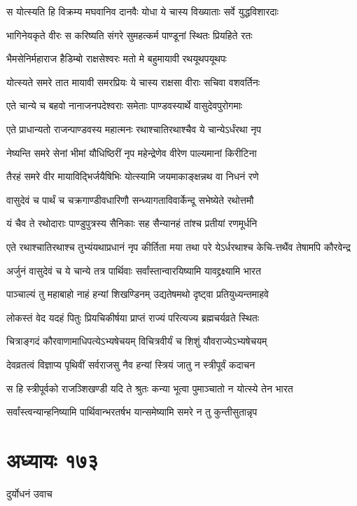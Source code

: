 \twolineshloka
{स योत्स्यति हि विक्रम्य मघवानिव दानवैः}
{योधा ये चास्य विख्याताः सर्वे युद्धविशारदाः}


\twolineshloka
{भागिनेयकृते वीरः स करिष्यति संगरे}
{सुमहत्कर्म पाण्डूनां स्थितः प्रियहिते रतः}


\twolineshloka
{भैमसेनिर्महाराज हैडिम्बो राक्षसेश्वरः}
{मतो मे बहुमायावी रथयूथपयूथपः}


\twolineshloka
{योत्स्यते समरे तात मायावी समरप्रियः}
{ये चास्य राक्षसा वीराः सचिवा वशवर्तिनः}


\twolineshloka
{एते चान्ये च बहवो नानाजनपदेश्वराः}
{समेताः पाण्डवस्यार्थे वासुदेवपुरोगमाः}


\twolineshloka
{एते प्राधान्यतो राजन्पाण्डवस्य महात्मनः}
{रथाश्चातिरथाश्चैव ये चान्येऽर्धंरथा नृप}


\twolineshloka
{नेष्यन्ति समरे सेनां भीमां यौधिष्ठिरीं नृप}
{महेन्द्रेणेव वीरेण पाल्यमानां किरीटिना}


\twolineshloka
{तैरहं समरे वीर मायाविद्भिर्जयैषिभिः}
{योत्स्यामि जयमाकाङ्क्षन्नथ वा निधनं रणे}


\twolineshloka
{वासुदेवं च पार्थं च चक्रगाण्डीवधारिणौ}
{सन्ध्यागताविवार्केन्दू सभेष्येते रथोत्तमौ}


\twolineshloka
{यं चैव ते रथोदाराः पाण्डुपुत्रस्य सैनिकाः}
{सह सैन्यानहं तांश्च प्रतीयां रणमूर्धनि}


\twolineshloka
{एते रथाश्चातिरथाश्च तुभ्यंयथाप्रधानं नृप कीर्तिता मया}
{तथा परे येऽर्धरथाश्च केचि-त्तथैंव तेषामपि कौरवेन्द्र}


\twolineshloka
{अर्जुनं वासुदेवं च ये चान्ये तत्र पार्थिवाः}
{सर्वांस्तान्वारयिष्यामि यावद्द्रक्ष्यामि भारत}


\twolineshloka
{पाञ्चाल्यं तु महाबाहो नाहं हन्यां शिखण्डिनम्}
{उद्यतेषमथो दृष्ट्वा प्रतियुध्यन्तमाहवे}


\twolineshloka
{लोकस्तं वेद यदहं पितुः प्रियचिकीर्षया}
{प्राप्तं राज्यं परित्यज्य ब्रह्मचर्यव्रते स्थितः}


\twolineshloka
{चित्राङ्गदं कौरवाणामाधिपत्येऽभ्यषेचयम्}
{विचित्रवीर्यं च शिशुं यौवराज्येऽभ्यषेचयम्}


\twolineshloka
{देवव्रतत्वं विज्ञाप्य पृथिवीं सर्वराजसु}
{नैव हन्यां स्त्रियं जातु न स्त्रीपूर्वं कदाचन}


\twolineshloka
{स हि स्त्रीपूर्वको राजञ्शिखण्डी यदि ते श्रुतः}
{कन्या भूत्वा पुमाञ्चातो न योत्स्ये तेन भारत}


\twolineshloka
{सर्वांस्त्वन्यान्हनिष्यामि पार्थिवान्भरतर्षभ}
{यान्समेष्यामि समरे न तु कुन्तीसुतान्नृप}


\chapter{अध्यायः १७३}
\twolineshloka
{दुर्योधनं उवाच}
{}


